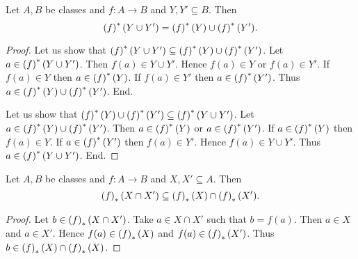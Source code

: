 \documentclass[../../set-theory/set-theory.tex]{subfiles}
\begin{document}
  \begin{forthel}
    \begin{proposition}
      Let $A, B$ be classes and $f : A \to B$ and $Y, Y' \subseteq B$.
      Then \[ \left(f\right)^{*}(Y \cup Y') = \left(f\right)^{*}(Y) \cup \left(f\right)^{*}(Y'). \]
    \end{proposition}
    \begin{proof}
      Let us show that $\left(f\right)^{*}(Y \cup Y') \subseteq \left(f\right)^{*}(Y) \cup \left(f\right)^{*}(Y')$.
        Let $a \in \left(f\right)^{*}(Y \cup Y')$.
        Then $f(a) \in Y \cup Y'$.
        Hence $f(a) \in Y$ or $f(a) \in Y'$.
        If $f(a) \in Y$ then $a \in \left(f\right)^{*}(Y)$.
        If $f(a) \in Y'$ then $a \in \left(f\right)^{*}(Y')$.
        Thus $a \in \left(f\right)^{*}(Y) \cup \left(f\right)^{*}(Y')$.
      End.

      Let us show that $\left(f\right)^{*}(Y) \cup \left(f\right)^{*}(Y') \subseteq \left(f\right)^{*}(Y \cup Y')$.
        Let $a \in \left(f\right)^{*}(Y) \cup \left(f\right)^{*}(Y')$.
        Then $a \in \left(f\right)^{*}(Y)$ or $a \in \left(f\right)^{*}(Y')$.
        If $a \in \left(f\right)^{*}(Y)$ then $f(a) \in Y$.
        If $a \in \left(f\right)^{*}(Y')$ then $f(a) \in Y'$.
        Hence $f(a) \in Y \cup Y'$.
        Thus $a \in \left(f\right)^{*}(Y \cup Y')$.
      End.
    \end{proof}
  \end{forthel}

  \begin{forthel}
    \begin{proposition}
      Let $A, B$ be classes and $f : A \to B$ and $X, X' \subseteq A$.
      Then \[ \left(f\right)_{*}(X \cap X') \subseteq \left(f\right)_{*}(X) \cap \left(f\right)_{*}(X'). \]
    \end{proposition}
    \begin{proof}
      Let $b \in \left(f\right)_{*}(X \cap X')$.
      Take $a \in X \cap X'$ such that $b = f(a)$.
      Then $a \in X$ and $a \in X'$.
      Hence $f(a) \in \left(f\right)_{*}(X)$ and $f(a) \in \left(f\right)_{*}(X')$.
      Thus $b \in \left(f\right)_{*}(X) \cap \left(f\right)_{*}(X)$.
    \end{proof}
  \end{forthel}
\end{document}
